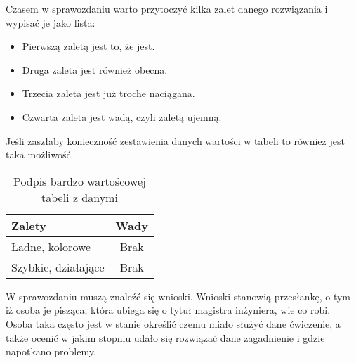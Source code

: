 \documentclass[a4paper,12pt]{article}
\newenvironment{lista}{
\begin{itemize}
  \setlength{\itemsep}{1pt}
  \setlength{\parskip}{0pt}
  \setlength{\parsep}{0pt}
}{\end{itemize}}
\begin{document}
Czasem w sprawozdaniu warto przytoczyć kilka zalet danego rozwiązania i wypisać je jako lista:
\begin{lista}
 \item Pierwszą zaletą jest to, że jest.
 \item Druga zaleta jest również obecna.
 \item Trzecia zaleta jest już troche naciągana.
 \item Czwarta zaleta jest wadą, czyli zaletą ujemną.
\end{lista}

Jeśli zaszłaby konieczność zestawienia danych wartości w tabeli to również jest taka możliwość.

\begin{table}[!hbp]
\centering
\begin{tabular}{|p{5cm}|c|}
\hline 
Zalety & Wady \tabularnewline
\hline 
 Ładne, kolorowe & Brak\tabularnewline
 Szybkie, działające & Brak\tabularnewline
\hline
\end{tabular}
\caption{Podpis bardzo wartoścowej tabeli z danymi}
\end{table}


W sprawozdaniu muszą znaleźć się wnioski. Wnioski stanowią przesłankę, o tym iż osoba je pisząca, która ubiega się o tytuł magistra inżyniera, wie co robi. Osoba taka często jest w stanie określić czemu miało służyć dane ćwiczenie, a także ocenić w jakim stopniu udało się rozwiązać dane zagadnienie i gdzie napotkano problemy.
\end{document}
